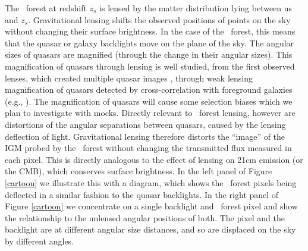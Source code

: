 The \lya\ forest at redshift $z_{s}$ is lensed by the matter
distribution lying between us and $z_{s}$. Gravitational lensing
shifts the observed positions of points on the sky without changing
their surface brightness.  In the case of the \lya\ forest, this means
that the quasar or galaxy backlights move on the plane of the sky.
The angular sizes of quasars are magnified (through the change in
their angular sizes). This magnification of quasars through lensing is
well studied, from the first observed lenses, which created multiple
quasar images \citep{walsh1979}, through weak lensing
magnification of quasars detected by cross-correlation with foreground
galaxies (e.g., \cite{scranton2005}).  The magnification of
quasars will cause some selection biases which we plan to investigate
with mocks. Directly relevant to \lya\ forest lensing, however
are distortions of the angular separations between quasars, caused by
the lensing deflection of light. 
  Gravitational lensing therefore distorts the ``image'' of the 
IGM probed by the \lya\ forest without
changing the transmitted flux measured in each pixel. This is directly
analogous to the effect of lensing on 21cm emission (or the CMB),
which conserves surface brightness.  In
the left panel of Figure \ref{cartoon} we
illustrate this with a diagram, which shows the \lya\ forest pixels
being deflected in a similar fashion to the quasar backlights. In
the right panel of 
Figure \ref{cartoon} we concentrate on a single backlight and \lya\
forest pixel and show the relationship to the unlensed angular
positions of both. The pixel and the backlight are at different
angular size distances, and so are displaced on the sky by different
angles.

